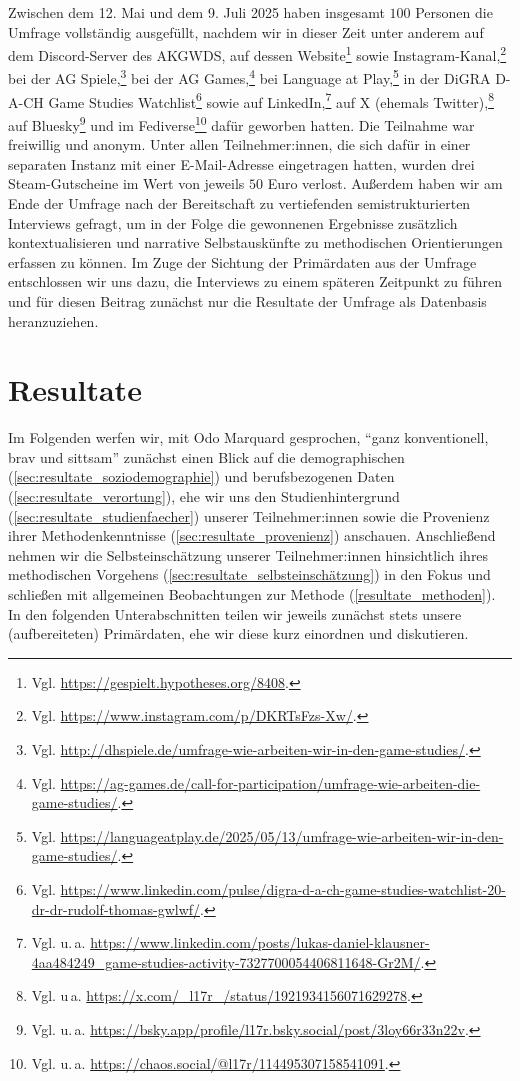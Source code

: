 \documentclass{scrartcl}
\begin{document}
Zwischen dem 12. Mai und dem 9. Juli 2025 haben insgesamt $100$ Personen die Umfrage vollständig ausgefüllt, nachdem wir in dieser Zeit unter anderem auf dem Discord-Server des AKGWDS, auf dessen Website\footnote{Vgl. \url{https://gespielt.hypotheses.org/8408}.} sowie Instagram-Kanal,\footnote{Vgl. \url{https://www.instagram.com/p/DKRTsFzs-Xw/}.} bei der AG Spiele,\footnote{Vgl. \url{http://dhspiele.de/umfrage-wie-arbeiten-wir-in-den-game-studies/}.} bei der AG Games,\footnote{Vgl. \url{https://ag-games.de/call-for-participation/umfrage-wie-arbeiten-die-game-studies/}.} bei Language at Play,\footnote{Vgl. \url{https://languageatplay.de/2025/05/13/umfrage-wie-arbeiten-wir-in-den-game-studies/}.} in der DiGRA D-A-CH Game Studies Watchlist\footnote{Vgl. \url{https://www.linkedin.com/pulse/digra-d-a-ch-game-studies-watchlist-20-dr-dr-rudolf-thomas-gwlwf/}.} sowie auf LinkedIn,\footnote{Vgl. u.\,a. \url{https://www.linkedin.com/posts/lukas-daniel-klausner-4aa484249_game-studies-activity-7327700054406811648-Gr2M/}.} auf X (ehemals Twitter),\footnote{Vgl. u\,a. \url{https://x.com/_l17r_/status/1921934156071629278}.} auf Bluesky\footnote{Vgl. u.\,a. \url{https://bsky.app/profile/l17r.bsky.social/post/3loy66r33n22v}.} und im Fediverse\footnote{Vgl. u.\,a. \url{https://chaos.social/@l17r/114495307158541091}.} dafür geworben hatten.
Die Teilnahme war freiwillig und anonym.
Unter allen Teilnehmer:innen, die sich dafür in einer separaten Instanz mit einer E-Mail-Adresse eingetragen hatten, wurden drei Steam-Gutscheine im Wert von jeweils $50$ Euro verlost.
Außerdem haben wir am Ende der Umfrage nach der Bereitschaft zu vertiefenden semistrukturierten Interviews gefragt, um in der Folge die gewonnenen Ergebnisse zusätzlich kontextualisieren und narrative Selbstauskünfte zu methodischen Orientierungen erfassen zu können.
Im Zuge der Sichtung der Primärdaten aus der Umfrage entschlossen wir uns dazu, die Interviews zu einem späteren Zeitpunkt zu führen und für diesen Beitrag zunächst nur die Resultate der Umfrage als Datenbasis heranzuziehen.


\section{Resultate}\label{sec:resultate}
Im Folgenden werfen wir, mit Odo Marquard gesprochen, \enquote{ganz konventionell, brav und sittsam}\autocite[][S.~33]{marquard_zur_1986} zunächst einen Blick auf die demographischen (\autoref{sec:resultate_soziodemographie}) und berufsbezogenen Daten (\autoref{sec:resultate_verortung}), ehe wir uns den Studienhintergrund (\autoref{sec:resultate_studienfaecher}) unserer Teilnehmer:innen sowie die Provenienz ihrer Methodenkenntnisse (\autoref{sec:resultate_provenienz}) anschauen.
Anschließend nehmen wir die Selbsteinschätzung unserer Teilnehmer:innen hinsichtlich ihres methodischen Vorgehens (\autoref{sec:resultate_selbsteinschätzung}) in den Fokus und schließen mit allgemeinen Beobachtungen zur Methode (\autoref{resultate_methoden}).
In den folgenden Unterabschnitten teilen wir jeweils zunächst stets unsere (aufbereiteten) Primärdaten, ehe wir diese kurz einordnen und diskutieren.
\end{document}

